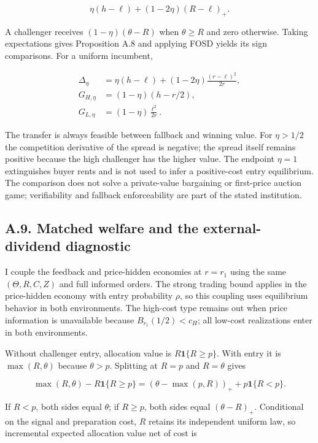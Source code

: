 \documentclass[
  11pt,
]{article}
\begin{document}
\[
\eta(h-\ell)+(1-2\eta)(R-\ell)_+.
\tag{OA.43}\label{eq:oa-oa-43}
\]

A challenger receives \((1-\eta)(\theta-R)\) when \(\theta\ge R\) and
zero otherwise. Taking expectations gives Proposition A.8 and applying
FOSD yields its sign comparisons. For a uniform incumbent,

\[
\begin{aligned}
\Delta_\eta&=\eta(h-\ell)+(1-2\eta)\frac{(r-\ell)^2}{2r},\\
G_{H,\eta}&=(1-\eta)(h-r/2),\\
G_{L,\eta}&=(1-\eta)\frac{\ell^2}{2r}.
\end{aligned}
\tag{OA.44}\label{eq:oa-oa-44}
\]

The transfer is always feasible between fallback and winning value. For
\(\eta>1/2\) the competition derivative of the spread is negative; the
spread itself remains positive because the high challenger has the
higher value. The endpoint \(\eta=1\) extinguishes buyer rents and is
not used to infer a positive-cost entry equilibrium. The comparison does
not solve a private-value bargaining or first-price auction game;
verifiability and fallback enforceability are part of the stated
institution.

\subsection{A.9. Matched welfare and the external-dividend
diagnostic}\label{oa-a-welfare}

I couple the feedback and price-hidden economies at \(r=r_1\) using the
same \((\Theta,R,C,Z)\) and full informed orders. The strong trading
bound applies in the price-hidden economy with entry probability
\(\rho\), so this coupling uses equilibrium behavior in both
environments. The high-cost type remains out when price information is
unavailable because \(B_{r_1}(1/2)<c_H\); all low-cost realizations
enter in both environments.

Without challenger entry, allocation value is \(R\mathbf1\{R\ge p\}\).
With entry it is \(\max(R,\theta)\) because \(\theta>p\). Splitting at
\(R=p\) and \(R=\theta\) gives

\[
\max(R,\theta)-R\mathbf1\{R\ge p\}
=(\theta-\max(p,R))_++p\mathbf1\{R<p\}.
\tag{OA.45}\label{eq:oa-oa-45}
\]

If \(R<p\), both sides equal \(\theta\); if \(R\ge p\), both sides equal
\((\theta-R)_+\). Conditional on the signal and preparation cost, \(R\)
retains its independent uniform law, so incremental expected allocation
value net of cost is
\end{document}
